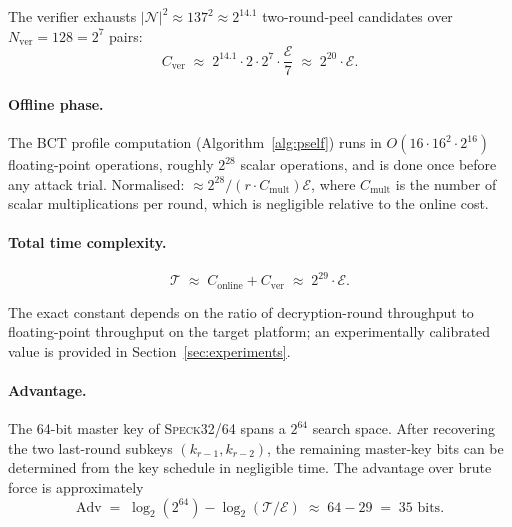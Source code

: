 \documentclass[runningheads]{llncs}
\newcommand{\speck}{\textsc{Speck}32/64}
\begin{document}
The verifier exhausts $|\mathcal{N}|^2 \approx 137^2 \approx 2^{14.1}$
two-round-peel candidates over $N_{\mathrm{ver}} = 128 = 2^7$ pairs:
\begin{equation}
  \label{eq:time-verify}
  C_{\mathrm{ver}} \;\approx\; 2^{14.1} \cdot 2 \cdot 2^7 \cdot \frac{\mathcal{E}}{7}
  \;\approx\; 2^{20} \cdot \mathcal{E}.
\end{equation}

\paragraph{Offline phase.}

The BCT profile computation (Algorithm~\ref{alg:pself}) runs in
$O(16 \cdot 16^2 \cdot 2^{16})$ floating-point operations, roughly
$2^{28}$ scalar operations, and is done once before any attack trial.
Normalised: $\approx 2^{28} / (r \cdot C_\mathrm{mult}) \mathcal{E}$,
where $C_\mathrm{mult}$ is the number of scalar multiplications per
round, which is negligible relative to the online cost.

\paragraph{Total time complexity.}

\begin{equation}
  \label{eq:time-total}
  \mathcal{T} \;\approx\; C_{\mathrm{online}} + C_{\mathrm{ver}}
  \;\approx\; 2^{29} \cdot \mathcal{E}.
\end{equation}

The exact constant depends on the ratio of decryption-round throughput to
floating-point throughput on the target platform; an experimentally
calibrated value is provided in Section~\ref{sec:experiments}.

\paragraph{Advantage.}

The 64-bit master key of \speck{} spans a $2^{64}$ search space.  After
recovering the two last-round subkeys $(k_{r-1}, k_{r-2})$, the remaining
master-key bits can be determined from the key schedule in negligible time.
The advantage over brute force is approximately
\begin{equation}
  \label{eq:advantage}
  \mathrm{Adv}
  \;=\; \log_2(2^{64}) - \log_2(\mathcal{T} / \mathcal{E})
  \;\approx\; 64 - 29 \;=\; 35 \text{ bits}.
\end{equation}
\end{document}
